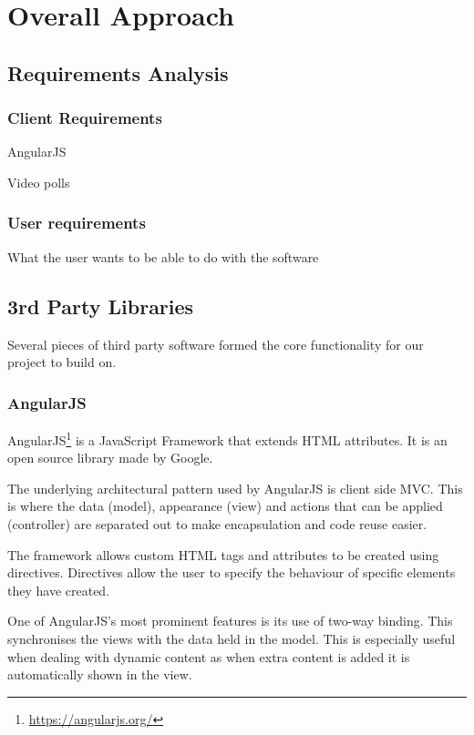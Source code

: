 \chapter{Overall Approach} 
\label{Chapter:Overall Approach}

\section{Requirements Analysis}

\subsection{Client Requirements}

AngularJS

Video polls

\subsection{User requirements}

What the user wants to be able to do with the software

\section{3rd Party Libraries}
Several pieces of third party software formed the core functionality for our project to build on.

\subsection{AngularJS}
\label{Section:AngularJS}
\gls{AngularJS}\footnote{\url{https://angularjs.org/}} is a JavaScript Framework that extends HTML attributes. It is an open source library made by Google.

The underlying architectural pattern used by \gls{AngularJS} is client side \gls{MVC}. This is where the data (model), appearance (view) and actions that can be applied (controller) are separated out to make encapsulation and code reuse easier. 

The framework allows custom HTML tags and attributes to be created using directives. Directives allow the user to specify the behaviour of specific elements they have created.

One of \gls{AngularJS}'s most prominent features is its use of two-way binding. This synchronises the views with the data held in the model. This is especially useful when dealing with dynamic content as when extra content is added it is automatically shown in the view.

